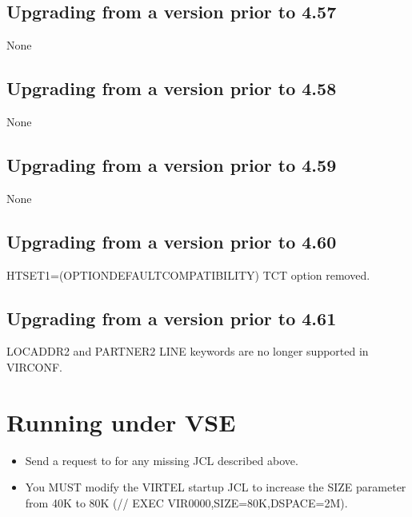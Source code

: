 \documentclass[letterpaper,10pt,english]{sphinxmanual}
\begin{document}
\ignorespaces 

\section{Upgrading from a version prior to 4.57}
\label{\detokenize{Migration_Guide:upgrading-from-a-version-prior-to-4-57}}\label{\detokenize{Migration_Guide:index-7}}
\sphinxAtStartPar
None


\section{Upgrading from a version prior to 4.58}
\label{\detokenize{Migration_Guide:upgrading-from-a-version-prior-to-4-58}}
\sphinxAtStartPar
None


\section{Upgrading from a version prior to 4.59}
\label{\detokenize{Migration_Guide:upgrading-from-a-version-prior-to-4-59}}
\sphinxAtStartPar
None


\section{Upgrading from a version prior to 4.60}
\label{\detokenize{Migration_Guide:upgrading-from-a-version-prior-to-4-60}}
\sphinxAtStartPar
HTSET1=(OPTION\sphinxhyphen{}DEFAULT\sphinxhyphen{}COMPATIBILITY) TCT option removed.


\section{Upgrading from a version prior to 4.61}
\label{\detokenize{Migration_Guide:upgrading-from-a-version-prior-to-4-61}}
\sphinxAtStartPar
LOCADDR2 and PARTNER2 LINE keywords are no longer supported in VIRCONF.

\newpage

\ignorespaces 

\chapter{Running under VSE}
\label{\detokenize{Migration_Guide:running-under-vse}}\label{\detokenize{Migration_Guide:index-8}}\begin{itemize}
\item {} 
\sphinxAtStartPar
Send a request to  for any missing JCL described above.

\item {} 
\sphinxAtStartPar
You MUST modify the VIRTEL startup JCL to increase the SIZE parameter from 40K to 80K (// EXEC VIR0000,SIZE=80K,DSPACE=2M).

\end{itemize}
\end{document}
